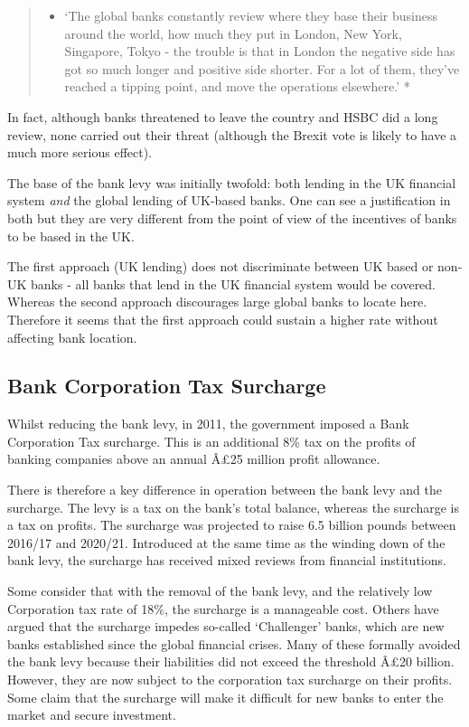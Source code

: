 \documentclass[]{tufte-handout}
\providecommand{\tightlist}{%
  \setlength{\itemsep}{0pt}\setlength{\parskip}{0pt}}
\begin{document}
\begin{quote}
\begin{itemize}
\tightlist
\item
  `The global banks constantly review where they base their business
  around the world, how much they put in London, New York, Singapore,
  Tokyo - the trouble is that in London the negative side has got so
  much longer and positive side shorter. For a lot of them, they've
  reached a tipping point, and move the operations elsewhere.' *
\end{itemize}
\end{quote}

In fact, although banks threatened to leave the country and HSBC did a
long review, none carried out their threat (although the Brexit vote is
likely to have a much more serious effect).

The base of the bank levy was initially twofold: both lending in the UK
financial system \emph{and} the global lending of UK-based banks. One
can see a justification in both but they are very different from the
point of view of the incentives of banks to be based in the UK.

The first approach (UK lending) does not discriminate between UK based
or non-UK banks - all banks that lend in the UK financial system would
be covered. Whereas the second approach discourages large global banks
to locate here. Therefore it seems that the first approach could sustain
a higher rate without affecting bank location.

\hypertarget{bank-corporation-tax-surcharge}{%
\subsection{Bank Corporation Tax
Surcharge}\label{bank-corporation-tax-surcharge}}

Whilst reducing the bank levy, in 2011, the government imposed a Bank
Corporation Tax surcharge. This is an additional 8\% tax on the profits
of banking companies above an annual Â£25 million profit allowance.

There is therefore a key difference in operation between the bank levy
and the surcharge. The levy is a tax on the bank's total balance,
whereas the surcharge is a tax on profits. The surcharge was projected
to raise 6.5 billion pounds between 2016/17 and 2020/21. Introduced at
the same time as the winding down of the bank levy, the surcharge has
received mixed reviews from financial institutions.

Some consider that with the removal of the bank levy, and the relatively
low Corporation tax rate of 18\%, the surcharge is a manageable cost.
Others have argued that the surcharge impedes so-called `Challenger'
banks, which are new banks established since the global financial
crises. Many of these formally avoided the bank levy because their
liabilities did not exceed the threshold Â£20 billion. However, they are
now subject to the corporation tax surcharge on their profits. Some
claim that the surcharge will make it difficult for new banks to enter
the market and secure investment.
\end{document}
